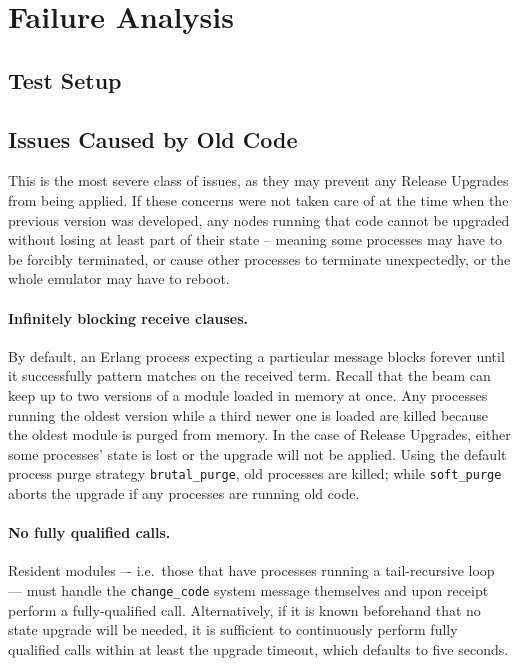 \cleardoublepage
\section{Failure Analysis}


\subsection{Test Setup}


\subsection{Issues Caused by Old Code}

This is the most severe class of issues, as they may prevent any Release Upgrades from being applied. If these concerns were not taken care of at the time when the previous version was developed, any nodes running that code cannot be upgraded without losing at least part of their state -- meaning some processes may have to be forcibly terminated, or cause other processes to terminate unexpectedly, or the whole emulator may have to reboot.

\paragraph{Infinitely blocking receive clauses.}
By default, an Erlang process expecting a particular message blocks forever until it successfully pattern matches on the received term. Recall that the \acrshort{beam} can keep up to two versions of a module loaded in memory at once. Any processes running the oldest version while a third newer one is loaded are killed because the oldest module is purged from memory. In the case of Release Upgrades, either some processes' state is lost or the upgrade will not be applied. Using the default process purge strategy \lstinline|brutal_purge|, old processes are killed; while \lstinline|soft_purge| aborts the upgrade if any processes are running old code.

\paragraph{No fully qualified calls.}
Resident modules –- i.e.~those that have processes running a tail-recursive loop –– must handle the \lstinline|change_code| system message themselves and upon receipt perform a fully-qualified call. Alternatively, if it is known beforehand that no state upgrade will be needed, it is sufficient to continuously perform fully qualified calls within at least the upgrade timeout, which defaults to five seconds.

